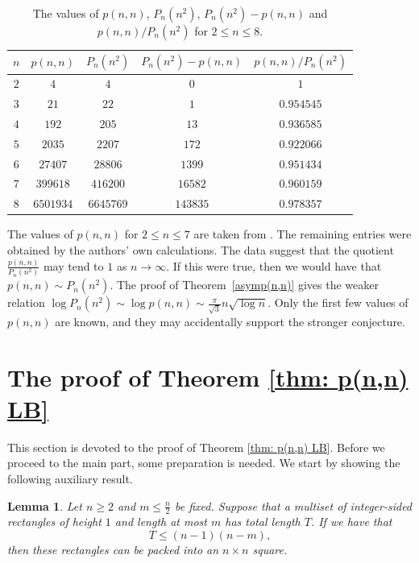 \documentclass[12pt,a4paper]{amsart}
\numberwithin{equation}{section}
\theoremstyle{plain}
\newtheorem{lm}[thm]{Lemma}
\theoremstyle{definition}
\theoremstyle{remark}
\renewcommand{\arraystretch}{1.3}
\begin{document}
\begin{table}[htb]
    \renewcommand{\arraystretch}{1.4}
\begin{tabular}{ c|c|c|c|c }
 $n$ & $p(n,n)$ & $P_n(n^2)$ & $P_n(n^2)-p(n,n)$ & $p(n,n)/ P_n(n^2)$\\\hline
  $2$ & $4$ & $4$ & $0$ & $1$\\
  $3$ & $21$ & $22$ & $1$ & $0.954545$\\
  $4$ & $192$ & $205$ & $13$ & $0.936585$\\
  $5$ & $2035$ & $2207$ & $172$ & $0.922066$\\
  $6$ & $27407$ & $28806$ & $1399$ & $0.951434$\\
  $7$ & $399618$ & $416200$ & $16582$ & $0.960159$\\
  $8$ & $6501934$ & $6645769$ & $143835$ & $0.978357$ \\
\end{tabular}
\medskip
\caption{The values of $p(n,n)$, $P_n(n^2)$, $P_n(n^2)-p(n,n)$ and $p(n,n)/P_n(n^2)$ for $2\le  n\le 8$.}
\label{tblp(n,n)vsP_n(n^2)}
\end{table}

The values of $p(n,n)$ for $2\le  n\le 7$ are taken from \cite{GVZ2026,OEISA360630}. The remaining entries were obtained by the authors' own calculations. The data suggest that the quotient $\tfrac{p(n,n)}{P_n(n^2)}$ may tend to $1$ as $n\to\infty$. If this were true, then we would have that $p(n,n)\sim P_n(n^2)$. The proof of Theorem~\ref{asymp(n,n)} gives the weaker relation
$
\log P_n(n^2)
\sim
\log p(n,n)
\sim
\tfrac{\pi}{\sqrt3}n\sqrt{\log n}.
$
Only the first few values of $p(n,n)$ are known, and they may accidentally support the stronger conjecture.


\section{The proof of Theorem \ref{thm: p(n,n) LB}}

This section is devoted to the proof of Theorem \ref{thm: p(n,n) LB}. Before we proceed to the main part, some preparation is needed. We start by showing the following auxiliary result.

\begin{lm}\label{lm: pack nxn}
Let $n\geq 2$ and $m\le \tfrac{n}{2}$ be fixed. Suppose that a multiset of integer-sided rectangles of height $1$ and length at most $m$ has total length $T$. If we have that
$$
T\le  (n-1)(n-m),
$$
then these rectangles can be packed into an $n\times n$ square.
\end{lm}
\end{document}
